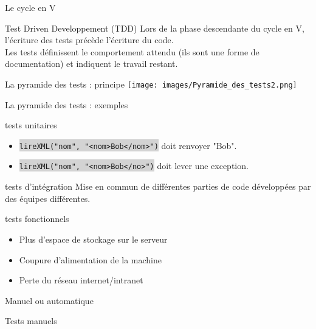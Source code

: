 \documentclass[a4paper]{beamer}
\newcommand{\code}[1]{\colorbox{lightgray}{\lstinline~#1~}}
\begin{document}
{\begin{frame}{Le cycle en V}
	\begin{block}{Test Driven Developpement (TDD)}
		Lors de la phase descendante du cycle en V, l'écriture des tests précède l'écriture du code.\\
		Les tests définissent le comportement attendu (ils sont une forme de documentation) et indiquent le travail restant.
	\end{block}

\end{frame}

\begin{frame}{La pyramide des tests : principe}
	\texttt{[image: images/Pyramide\_des\_tests2.png]}
\end{frame}

\begin{frame}{La pyramide des tests : exemples}
	\begin{block}{tests unitaires}
		\begin{itemize}
			\item \small \code{lireXML("nom", "<nom>Bob</nom>")} doit renvoyer "Bob".
			\item \code{lireXML("nom", "<nom>Bob</no>")} doit lever une exception.
		\end{itemize}
	\end{block}
	\begin{block}{tests d'intégration}
		Mise en commun de différentes parties de code développées par des équipes différentes.
	\end{block}
	\begin{block}{tests fonctionnels}
		\begin{itemize}
			\item Plus d'espace de stockage sur le serveur
			\item Coupure d'alimentation de la machine
			\item Perte du réseau internet/intranet
		\end{itemize}
	\end{block}
\end{frame}
	
\begin{frame}{Manuel ou automatique}
	\begin{block}{Tests manuels}
		

\end{block}
\end{frame}}
\end{document}
